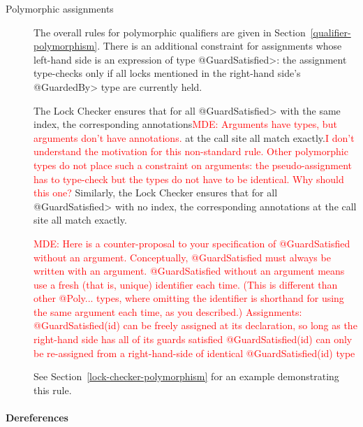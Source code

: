 \begin{description}

\item[Polymorphic assignments]
  The overall rules for polymorphic qualifiers are given in
  Section~\ref{qualifier-polymorphism}.  There is an additional constraint
  for assignments whose
  left-hand side is an expression of type
  \<@GuardSatisfied>:  the assignment type-checks only if all locks
  mentioned in the right-hand side's \<@GuardedBy> type are currently held.

\item[]

  The Lock Checker ensures that for all \<@GuardSatisfied> with the same index, the
  corresponding  annotations\textcolor{red}{MDE: Arguments have types, but arguments don't have annotations.}
  at the call site all match exactly.\textcolor{red}{I don't understand the
    motivation for this non-standard rule.  Other polymorphic types do not
    place such a constraint on arguments:  the pseudo-assignment has to
    type-check but the types do not have to be identical.  Why should this
    one?}
  Similarly, the Lock Checker ensures that for all \<@GuardSatisfied> with no index, the
  corresponding  annotations at the call site all match exactly.

\textcolor{red}{MDE:
  Here is a counter-proposal to your specification of @GuardSatisfied
  without an argument.
  Conceptually, @GuardSatisfied must always be written with an argument.
  @GuardSatisfied without an argument means use a fresh (that is, unique) identifier each time.
  (This is different than other @Poly... types, where omitting the
  identifier is shorthand for using the same argument each time, as you
  described.)
Assignments:
  @GuardSatisfied(id) can be freely assigned at its declaration, so long as the right-hand side has all of its guards satisfied
  @GuardSatisfied(id) can only be re-assigned from a right-hand-side of identical @GuardSatisfied(id) type}


  See Section~\ref{lock-checker-polymorphism} for an example demonstrating this rule.

\end{description}

\paragraph{Dereferences}


